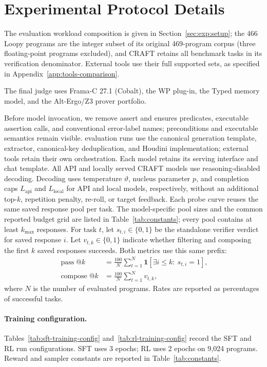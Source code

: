 \section{Experimental Protocol Details}
\label{app:experimental-protocol}

The evaluation workload composition is given in
Section~\ref{sec:exp:setup}; the 466 Loopy programs are the integer subset
of its original 469-program corpus (three floating-point programs excluded),
and CRAFT retains all benchmark tasks in its verification denominator.
External tools use their full supported sets, as specified in
Appendix~\ref{app:tools-comparison}.

The final judge uses Frama-C 27.1 (Cobalt), the WP plug-in, the Typed
memory model, and the Alt-Ergo/Z3 prover portfolio.

Before model invocation, we remove assert and ensures
predicates, executable assertion calls, and conventional error-label names;
preconditions and
executable semantics remain visible.  \sam{} evaluation
runs use the canonical generation template, extractor, canonical-key deduplication,
and Houdini implementation; external tools retain their own orchestration.
Each model retains its serving interface and chat template.  All API and
locally served CRAFT models use reasoning-disabled decoding.
Decoding uses temperature \(\vartheta\), nucleus parameter \(p\), and
completion caps \(L_{\mathrm{api}}\) and \(L_{\mathrm{local}}\) for API and
local models, respectively, without an additional top-\(k\), repetition
penalty, re-roll, or target feedback.  Each probe curve reuses the same saved
response pool per task.  The model-specific pool sizes and the common reported
budget grid are listed in Table~\ref{tab:constants}; every pool contains at
least \(k_{\max}\) responses.
For task \(t\), let \(s_{t,i}\in\{0,1\}\) be the standalone verifier
verdict for saved response \(i\).
Let \(v_{t,k}\in\{0,1\}\) indicate whether filtering and composing the first
\(k\) saved responses succeeds. Both metrics use this same prefix:
\[
\begin{aligned}
 \operatorname{pass}@k
  &=\frac{100}{N}\sum_{t=1}^N
    \mathbf{1}\!\left[\exists i\leq k:\ s_{t,i}=1\right],\\
 \operatorname{compose}@k
  &=\frac{100}{N}\sum_{t=1}^N v_{t,k},
\end{aligned}
\]
where \(N\) is the number of evaluated programs. Rates are reported as
percentages of successful tasks.

\paragraph{Training configuration.}
Tables~\ref{tab:sft-training-config} and~\ref{tab:rl-training-config}
record the SFT and RL run configurations. SFT uses 3 epochs;
RL uses 2 epochs on 9,024 programs. Reward and sampler constants are reported
in Table~\ref{tab:constants}.


